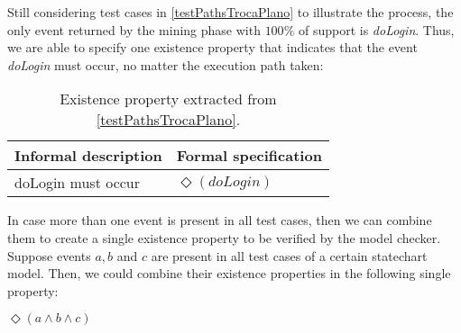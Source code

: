 Still considering test cases in \ref{testPathsTrocaPlano} to illustrate the process, the only event returned by the mining phase with $100\%$ of support is \textit{doLogin}. Thus, we are able to specify one existence property that indicates that the event \textit{doLogin} must occur, no matter the execution path taken:

\begin{table}[h]
\begin{center}
\begin{tabular}{|l | l|}

\hline

Informal description & Formal specification \\ \hline

doLogin must occur & $\Diamond (doLogin)$ \\

\hline
\end{tabular}
\end{center}
\caption{Existence property extracted from \ref{testPathsTrocaPlano}.}
\label{existencePropertyTrocaPlano}
\end{table}

In case more than one event is present in all test cases, then we can combine them to create a single existence property to be verified by the model checker. Suppose events $a, b$ and $c$ are present in all test cases of a certain statechart model. Then, we could combine their existence properties in the following single property:

\begin{center}
$\Diamond (a \wedge b \wedge c)$
\end{center}
